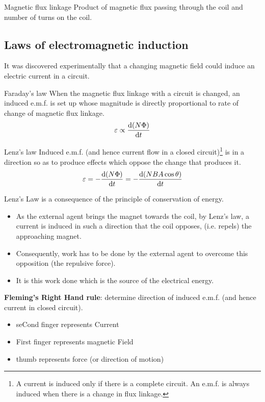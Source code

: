 \begin{defn}{Magnetic flux linkage}{}
Product of magnetic flux passing through the coil and
number of turns on the coil.
\end{defn}
\pagebreak

\subsection{Laws of electromagnetic induction}
It was discovered experimentally that a changing magnetic field could induce an electric current in a circuit.

\begin{defn}{Faraday's law}{}
When the magnetic flux linkage with a circuit is changed, an induced e.m.f. is set up whose magnitude is directly proportional to rate of change of magnetic flux linkage.
\[ \varepsilon \propto \dv{(N\Phi)}{t} \]
\end{defn}

\begin{defn}{Lenz's law}{}
Induced e.m.f. (and hence current flow in a closed circuit)\footnote{A current is induced only if there is a complete circuit. An e.m.f. is always induced when there is a change in flux linkage.} is in a direction so as to produce effects which oppose the change that produces it.
\begin{equation}
\varepsilon = -\dv{(N\Phi)}{t} = -\dv{(NBA\cos\theta)}{t}
\end{equation}
\end{defn}

Lenz's Law is a consequence of the principle of conservation of energy.
\begin{itemize}
\item As the external agent brings the magnet towards the coil, by Lenz’s law, a current is induced in such a direction that the coil opposes, (i.e. repels) the approaching magnet.
\item Consequently, work has to be done by the external agent to overcome this opposition (the repulsive force).
\item It is this work done which is the source of the electrical energy.
\end{itemize}

\begin{tcolorbox}
\textbf{Fleming’s Right Hand rule}: determine direction of induced e.m.f. (and hence current in closed circuit).
\begin{itemize}
\item seCond finger represents Current
\item First finger represents magnetic Field
\item thumb represents force (or direction of motion)
\end{itemize}
\end{tcolorbox}

